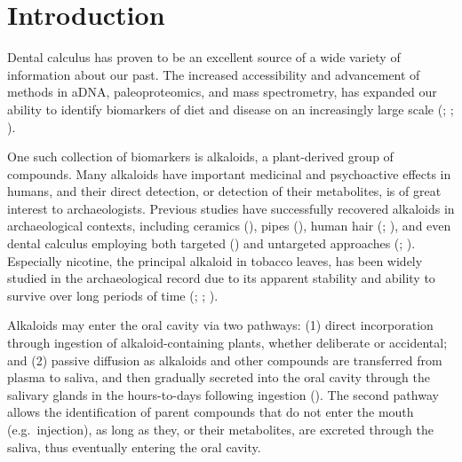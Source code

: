 \documentclass[
  11pt,
  leqno]{scrartcl}
\title{}
\author{}
\date{}
\begin{document}
\section{Introduction}\label{introduction}

Dental calculus has proven to be an excellent source of a wide variety
of information about our past. The increased accessibility and
advancement of methods in aDNA, paleoproteomics, and mass spectrometry,
has expanded our ability to identify biomarkers of diet and disease on
an increasingly large scale
(;
;
).

One such collection of biomarkers is alkaloids, a plant-derived group of
compounds. Many alkaloids have important medicinal and psychoactive
effects in humans, and their direct detection, or detection of their
metabolites, is of great interest to archaeologists. Previous studies
have successfully recovered alkaloids in archaeological contexts,
including ceramics (), pipes (), human hair
(; ), and even dental calculus employing both targeted
() and
untargeted approaches (;
). Especially nicotine, the principal alkaloid in tobacco leaves,
has been widely studied in the archaeological record due to its apparent
stability and ability to survive over long periods of time
(;
; ).

Alkaloids may enter the oral cavity via two pathways: (1) direct
incorporation through ingestion of alkaloid-containing plants, whether
deliberate or accidental; and (2) passive diffusion as alkaloids and
other compounds are transferred from plasma to saliva, and then
gradually secreted into the oral cavity through the salivary glands in
the hours-to-days following ingestion
(). The
second pathway allows the identification of parent compounds that do not
enter the mouth (e.g.~injection), as long as they, or their metabolites,
are excreted through the saliva, thus eventually entering the oral
cavity.
\end{document}
